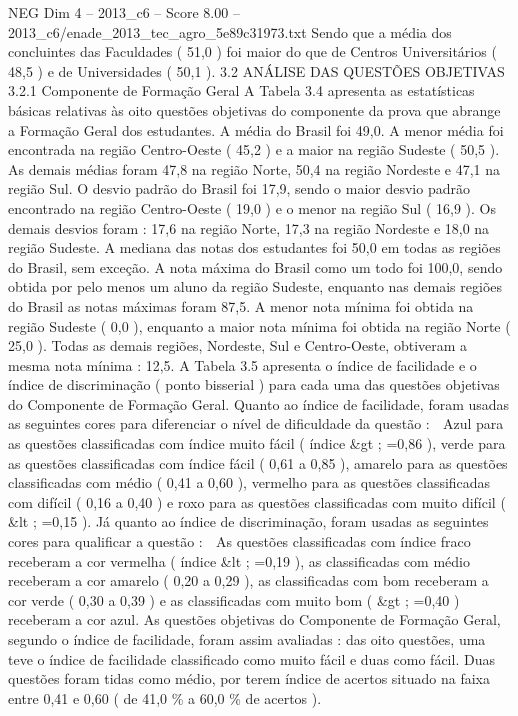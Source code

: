 \begin{textsample}{NEG Dim 4 – 2013\_c6 – Score 8.00 – 2013\_c6/enade\_2013\_tec\_agro\_5e89c31973.txt}
Sendo que a média dos concluintes das Faculdades ( 51,0 ) foi maior do que de Centros Universitários ( 48,5 ) e de Universidades ( 50,1 ). 3.2 ANÁLISE DAS QUESTÕES OBJETIVAS 3.2.1 Componente de Formação Geral A Tabela 3.4 apresenta as estatísticas básicas relativas às oito questões objetivas do componente da prova que abrange a Formação Geral dos estudantes.
A média do Brasil foi 49,0.
A menor média foi encontrada na região Centro-Oeste ( 45,2 ) e a maior na região Sudeste ( 50,5 ).
As demais médias foram 47,8 na região Norte, 50,4 na região Nordeste e 47,1 na região Sul.
O desvio padrão do Brasil foi 17,9, sendo o maior desvio padrão encontrado na região Centro-Oeste ( 19,0 ) e o menor na região Sul ( 16,9 ).
Os demais desvios foram : 17,6 na região Norte, 17,3 na região Nordeste e 18,0 na região Sudeste.
A mediana das notas dos estudantes foi 50,0 em todas as regiões do Brasil, sem exceção.
A nota máxima do Brasil como um todo foi 100,0, sendo obtida por pelo menos um aluno da região Sudeste, enquanto nas demais regiões do Brasil as notas máximas foram 87,5.
A menor nota mínima foi obtida na região Sudeste ( 0,0 ), enquanto a maior nota mínima foi obtida na região Norte ( 25,0 ).
Todas as demais regiões, Nordeste, Sul e Centro-Oeste, obtiveram a mesma nota mínima : 12,5.
A Tabela 3.5 apresenta o índice de facilidade e o índice de discriminação ( ponto bisserial ) para cada uma das questões objetivas do Componente de Formação Geral.
Quanto ao índice de facilidade, foram usadas as seguintes cores para diferenciar o nível de dificuldade da questão :  Azul para as questões classificadas com índice muito fácil ( índice \&gt ; =0,86 ), verde para as questões classificadas com índice fácil ( 0,61 a 0,85 ), amarelo para as questões classificadas com médio ( 0,41 a 0,60 ), vermelho para as questões classificadas com difícil ( 0,16 a 0,40 ) e roxo para as questões classificadas com muito difícil ( \&lt ; =0,15 ).
Já quanto ao índice de discriminação, foram usadas as seguintes cores para qualificar a questão :  As questões classificadas com índice fraco receberam a cor vermelha ( índice \&lt ; =0,19 ), as classificadas com médio receberam a cor amarelo ( 0,20 a 0,29 ), as classificadas com bom receberam a cor verde ( 0,30 a 0,39 ) e as classificadas com muito bom ( \&gt ; =0,40 ) receberam a cor azul.
As questões objetivas do Componente de Formação Geral, segundo o índice de facilidade, foram assim avaliadas : das oito questões, uma teve o índice de facilidade classificado como muito fácil e duas como fácil.
Duas questões foram tidas como médio, por terem índice de acertos situado na faixa entre 0,41 e 0,60 ( de 41,0 \% a 60,0 \% de acertos ).

\end{textsample}
